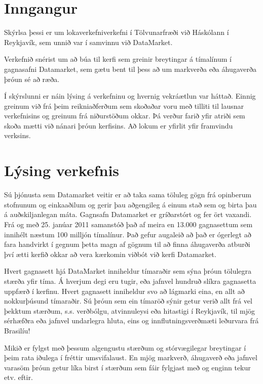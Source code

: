 \documentclass{article}
\begin{document}
\tableofcontents
\newpage

\section{Inngangur}
Skýrlsa þessi er um lokaverkefniverkefni í Tölvunarfræði við Háskólann í Reykjavík, 
sem unnið var í samvinnu við DataMarket.

Verkefnið snérist um að búa til kerfi sem greinir
breytingar á tímalínum í gagnasafni Datamarket, 
sem gætu bent til þess að um markverða eða áhugaverða þróun sé að ræða.

Í skýrslunni er náin lýsing á verkefninu og hvernig vekráætlun var háttað.
Einnig greinum við frá þeim reikniaðferðum sem skoðaðar voru með tilliti til 
lausnar verkefnisins og greinum frá niðurstöðum okkar. Þá 
verður farið yfir atriði sem skoða mætti við nánari þróun kerfisins.
Að lokum er yfirlit yfir framvindu verksins.

\newpage
\section{Lýsing verkefnis}

Sú þjónusta sem Datamarket veitir er að taka sama töluleg gögn frá opinberum
stofnunum og einkaaðilum og gerir þau aðgengileg á einum stað sem og birta þau á
auðskiljanlegan máta. Gagnsafn Datamarket er gríðarstórt og fer ört vaxandi. Frá
og með 25. janúar 2011 samanstóð það af meira en 13.000 gagnasettum sem innihélt
næstum 100 milljón tímalínur. Það gefur augaleið að það er ógerlegt að fara
handvirkt í gegnum þetta magn af gögnum til að finna áhugaverða atburði því ætti
kerfið okkar að vera kærkomin viðbót við kerfi Datamarket.

Hvert gagnasett hjá DataMarket inniheldur tímaraðir sem sýna þróun tölulegra stærða yfir tíma. Á hverjum degi eru tugir, eða jafnvel hundruð slíkra gagnasetta uppfærð í kerfinu. Hvert gagnasett inniheldur svo að lágmarki eina, en allt að nokkurþúsund tímaraðir. Sú
þróun sem ein tímaröð sýnir getur verið allt frá vel
þekktum stærðum, s.s. verðbólgu, atvinnuleysi eða
hitastigi í Reykjavík, til mjög sérhæfðra eða jafnvel
undarlegra hluta, eins og innflutningsverðmæti
leðurvara frá Brasilíu!

Mikið er fylgst með þessum algengustu stærðum og
stórvægilegar breytingar í þeim rata iðulega í fréttir
umsvifalaust. En mjög markverð, áhugaverð eða jafnvel
varasöm þróun getur líka birst í stærðum sem fáir
fylgjast með og enginn tekur etv. eftir.
\end{document}
